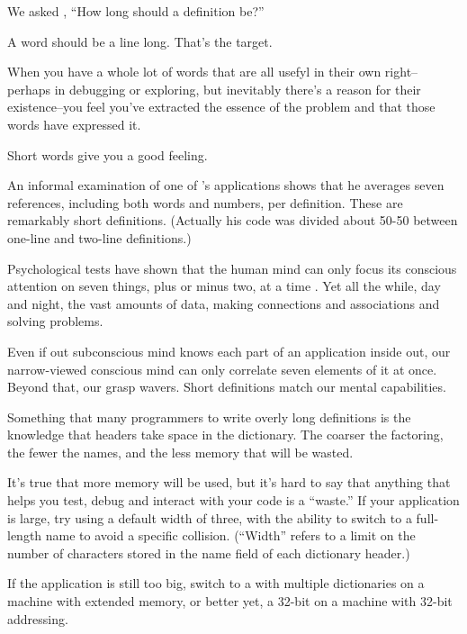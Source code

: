 \begin{interview}
We asked ,
``How long should a \Forth{} definition be?''

\begin{tfquot}
A word should be a line long. That's the target.

When you have a whole lot of words that are all usefyl in their own right--perhaps in debugging or exploring, but inevitably there's a reason for their existence--you feel you've extracted the essence of the problem and that those words have expressed it.

Short words give you a good feeling.
\end{tfquot}
\end{interview}

An informal examination of one of 's applications shows that he averages seven references, including both words and numbers, per definition. These are remarkably short definitions. (Actually his code was divided about 50-50 between one-line and two-line definitions.)

Psychological tests have shown that the human mind can only focus its conscious attention on seven things, plus or minus two, at a time \cite{miller56}. Yet all the while, day and night, the vast amounts of data, making connections and associations and solving problems.

Even if out subconscious mind knows each part of an application inside out, our narrow-viewed conscious mind can only correlate seven elements of it at once. Beyond that, our grasp wavers. Short definitions match our mental capabilities.

Something that many \Forth{} programmers to write overly long definitions is the knowledge that headers take space in the dictionary. The coarser the factoring, the fewer the names, and the less memory that will be wasted.

It's true that more memory will be used, but it's hard to say that anything that helps you test, debug and interact with your code is a ``waste.'' If your application is large, try using a default width of three, with the ability to switch to a full-length name to avoid a specific collision. (``Width'' refers to a limit on the number of characters stored in the name field of each dictionary header.)

If the application is still too big, switch to a \Forth{} with multiple dictionaries on a machine with extended memory, or better yet, a 32-bit \Forth{} on a machine with 32-bit addressing.

